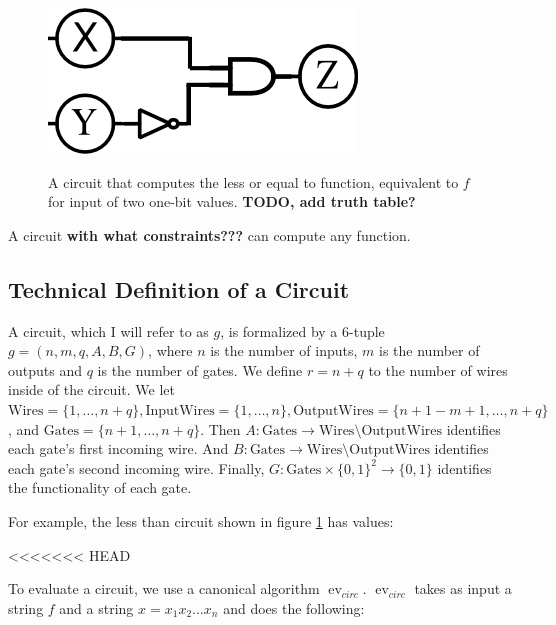 \documentclass[12pt,twoside]{reedthesis}
\newcommand{\Gates}{\text{Gates}}
\newcommand{\InputWires}{\text{InputWires}}
\newcommand{\OutputWires}{\text{OutputWires}}
\newcommand{\Wires}{\text{Wires}}
\begin{document}
\begin{figure}[h]
    \centering
    \includegraphics[scale=0.75]{images/drawing.png}
    \label{fig:less_than_circuit}
    \caption{A circuit that computes the less or equal to function, equivalent to $f$ for input of two one-bit values. \textbf{TODO, add truth table?}}
\end{figure}

A circuit \textbf{with what constraints???} can compute any function.

\subsection{Technical Definition of a Circuit}
A circuit, which I will refer to as $g$, is formalized by a 6-tuple $g = (n,m,q,A,B,G)$, where $n$ is the number of inputs, $m$ is the number of outputs and $q$ is the number of gates.
We define $r = n + q$ to the number of wires inside of the circuit.
We let $\Wires = \{1,\ldots, n+q\}, \InputWires = \{1,\ldots, n\}, \OutputWires = \{n+1-m+1, \ldots,n+q\}$, and $\Gates = \{n+1, \ldots, n+q\}$.
Then $A : \Gates \to \Wires \setminus \OutputWires$ identifies each gate's first incoming wire.
And $B : \Gates \to \Wires \setminus \OutputWires$ identifies each gate's second incoming wire.
Finally, $G: \Gates \times \{0,1\}^2 \to \{0,1\}$ identifies the functionality of each gate.

For example, the less than circuit shown in figure \ref{fig:less_than_circuit} has values:

<<<<<<< HEAD
\newcommand{\Gb}{\operatorname{Gb}}
\newcommand{\En}{\operatorname{En}}
\newcommand{\De}{\operatorname{De}}
\newcommand{\Ev}{\operatorname{Ev}}
\newcommand{\ev}{\operatorname{ev}}
\newcommand{\evcirc}{\ev_{circ}}

\newcommand{\fbar}{f^-}
\newcommand{\Topo}{\operatorname{Topo}}
\renewcommand{\algorithmicrequire}{\textbf{Input:}}
\renewcommand{\algorithmicensure}{\textbf{Output:}}

To evaluate a circuit, we use a canonical algorithm $\evcirc$.
$\evcirc$ takes as input a string $f$ and a string $x = x_1 x_2 \ldots x_n$ and does the following:
\end{document}
